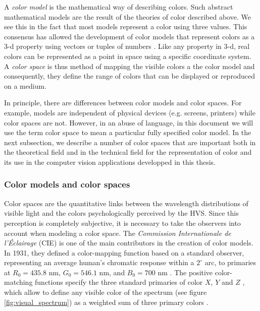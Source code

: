 A \textit{color model} is the mathematical way of describing colors. Such abstract mathematical models are the result of the theories of color described above. We see this in the fact that most models represent a color using three values. This consensus has allowed the development of color models that represent colors as a 3-d property using vectors or tuples of numbers \citep{Douglas.Kerr:Online:2005}. Like any property in 3-d, real colors can be represented as a point in space using a specific coordinate system. A \textit{color space} is thus method of mapping the visible colors a the color model and consequently, they define the range of colors that can be displayed or reproduced on a medium. 

In principle, there are differences between color models and color spaces. For example, models are independent of physical devices (e.g. screens, printers) while color spaces are not. However, in an abuse of language, in this document we will use the term color space to mean a particular fully specified color model. In the next subsection, we describe a number of color spaces that are important both in the theoretical field and in the technical field for the representation of color and its use in the computer vision applications developped in this thesis.
 

\subsubsection{Color models and color spaces}
Color spaces are the quantitative links between the wavelength distributions of visible light and the colors psychologically perceived by the HVS. Since this perception is completely subjective, it is necessary to take the observers into account when modeling a color space. The \textit{Commission Internationale de l'Éclairage} (CIE) is one of the main contributors in the creation of color models. In 1931, they defined a color-mapping function based on a standard observer, representing an average human’s chromatic response within a $2^ \circ$ arc, to primaries at $R_0 = 435.8$ nm, $G_0 = 546.1$ nm, and $B_0 = 700$ nm \citep{Bull:Book:2014}. The positive color-matching functions specify the three standard primaries of color $X$, $Y$ and $Z$ \citep{CIE:Journal:1932}, which allow to define any visible color of the spectrum (see figure \ref{fig:visual_spectrum}) as a weighted sum of three primary colors \citep{Wright:BookCh2:2007}.

